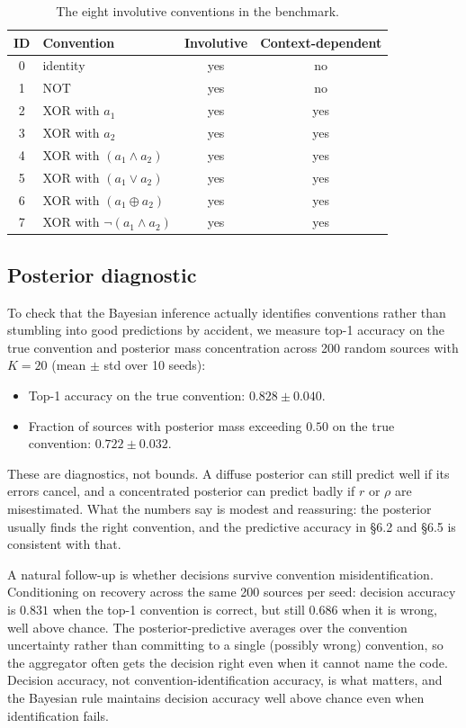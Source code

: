 \begin{table}[h]
\centering
\caption{The eight involutive conventions in the benchmark.}
\label{tab:conventions}
\begin{tabular}{clcc}
\toprule
ID & Convention & Involutive & Context-dependent \\
\midrule
0 & identity & yes & no \\
1 & NOT & yes & no \\
2 & XOR with $a_1$ & yes & yes \\
3 & XOR with $a_2$ & yes & yes \\
4 & XOR with $(a_1 \land a_2)$ & yes & yes \\
5 & XOR with $(a_1 \lor a_2)$ & yes & yes \\
6 & XOR with $(a_1 \oplus a_2)$ & yes & yes \\
7 & XOR with $\lnot(a_1 \land a_2)$ & yes & yes \\
\bottomrule
\end{tabular}
\end{table}

\subsection{Posterior diagnostic}

To check that the Bayesian inference actually identifies conventions rather
than stumbling into good predictions by accident, we measure top-1 accuracy
on the true convention and posterior mass concentration across 200 random
sources with $K=20$ (mean $\pm$ std over 10 seeds):

\begin{itemize}
\item Top-1 accuracy on the true convention: $0.828 \pm 0.040$.
\item Fraction of sources with posterior mass exceeding $0.50$ on the true convention: $0.722 \pm 0.032$.
\end{itemize}

These are diagnostics, not bounds. A diffuse posterior can still predict
well if its errors cancel, and a concentrated posterior can predict badly
if $r$ or $\rho$ are misestimated. What the numbers say is modest and
reassuring: the posterior usually finds the right convention, and the
predictive accuracy in \S6.2 and \S6.5 is consistent with that.

A natural follow-up is whether decisions survive convention
misidentification. Conditioning on recovery across the same 200 sources
per seed: decision accuracy is $0.831$ when the top-1 convention is
correct, but still $0.686$ when it is wrong, well above chance. The
posterior-predictive averages over the convention uncertainty rather than
committing to a single (possibly wrong) convention, so the aggregator
often gets the decision right even when it cannot name the code. Decision
accuracy, not convention-identification accuracy, is what matters, and the
Bayesian rule maintains decision accuracy well above chance even when
identification fails.

